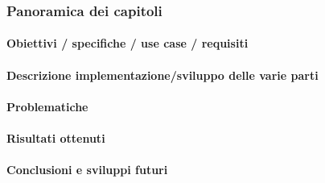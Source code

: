 \documentclass[12pt]{article}
\begin{document}
\subsubsection{Panoramica dei capitoli}
\paragraph{Obiettivi / specifiche / use case / requisiti}
\paragraph{Descrizione implementazione/sviluppo delle varie parti}
\paragraph{Problematiche}
\paragraph{Risultati ottenuti}
\paragraph{Conclusioni e sviluppi futuri}
\end{document}
